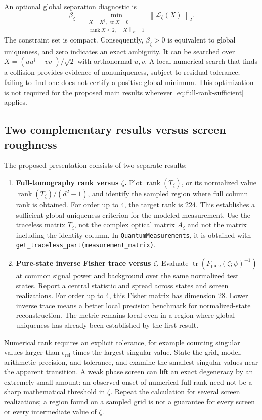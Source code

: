 \documentclass[11pt,a4paper]{article}
\newcommand{\tr}{\operatorname{tr}}
\newcommand{\rank}{\operatorname{rank}}
\newcommand{\norm}[1]{\left\lVert#1\right\rVert}
\begin{document}
An optional global separation diagnostic is
\begin{equation}
 \beta_\zeta=\min_{\substack{X=X^\dagger,\ \tr X=0\\
 \rank X\le2,\ \norm{X}_F=1}}\norm{\mathcal L_\zeta(X)}_2.
\end{equation}
The constraint set is compact. Consequently, $\beta_\zeta>0$ is equivalent
to global uniqueness, and zero indicates an exact ambiguity. It can be
searched over $X=(uu^\dagger-vv^\dagger)/\sqrt2$ with orthonormal $u,v$.
A local numerical search that finds a collision provides evidence of
nonuniqueness, subject to residual tolerance; failing to find one does not
certify a positive global minimum. This optimization is not required for
the proposed main results wherever \eqref{eq:full-rank-sufficient} applies.

\subsection{Two complementary results versus screen roughness}
The proposed presentation consists of two separate results:
\begin{enumerate}
 \item \textbf{Full-tomography rank versus $\zeta$.}
 Plot $\rank(T_\zeta)$, or its normalized value
 $\rank(T_\zeta)/(d^2-1)$, and identify the sampled region where full
 column rank is obtained. For order up to 4, the target rank is 224.
 This establishes a sufficient global uniqueness criterion for the modeled
 measurement. Use the traceless matrix $T_\zeta$, not the complex optical
 matrix $A_\zeta$ and not the matrix including the identity column.
 In \texttt{QuantumMeasurements}, it is obtained with
 \texttt{get\_traceless\_part(measurement\_matrix)}.
 \item \textbf{Pure-state inverse Fisher trace versus $\zeta$.}
 Evaluate $\tr(F_{\mathrm{pure}}(\zeta;\psi)^{-1})$ at common signal power
 and background over the same normalized test states. Report a central
 statistic and spread across states and screen realizations. For order
 up to 4, this Fisher matrix has dimension 28. Lower inverse trace means
 a better local precision benchmark for normalized-state reconstruction.
 The metric remains local even in a region where global uniqueness has
 already been established by the first result.
\end{enumerate}

Numerical rank requires an explicit tolerance, for example counting
singular values larger than $\epsilon_{\mathrm{rel}}$ times the largest
singular value. State the grid, model, arithmetic precision, and tolerance,
and examine the smallest singular values near the apparent transition.
A weak phase screen can lift an exact degeneracy by an extremely small
amount: an observed onset of numerical full rank need not be a sharp
mathematical threshold in $\zeta$. Repeat the calculation for several
screen realizations; a region found on a sampled grid is not a guarantee
for every screen or every intermediate value of $\zeta$.
\end{document}
